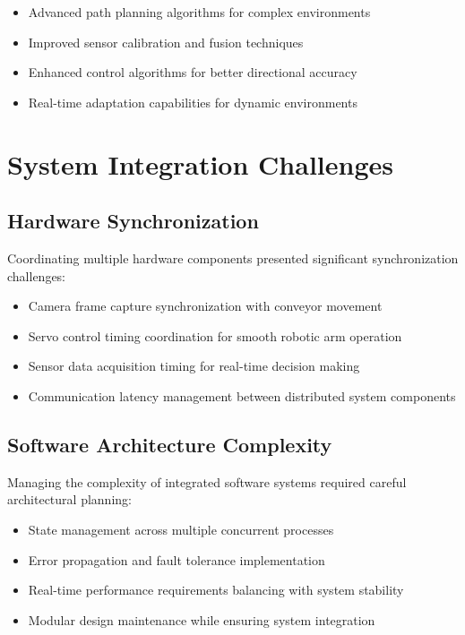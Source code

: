 \documentclass{book}
\begin{document}
\begin{itemize}
\item Advanced path planning algorithms for complex environments
\item Improved sensor calibration and fusion techniques
\item Enhanced control algorithms for better directional accuracy
\item Real-time adaptation capabilities for dynamic environments
\end{itemize}

\section{System Integration Challenges}

\subsection{Hardware Synchronization}

\par\noindent Coordinating multiple hardware components presented significant synchronization challenges:

\begin{itemize}
\item Camera frame capture synchronization with conveyor movement
\item Servo control timing coordination for smooth robotic arm operation
\item Sensor data acquisition timing for real-time decision making
\item Communication latency management between distributed system components
\end{itemize}

\subsection{Software Architecture Complexity}

\par\noindent Managing the complexity of integrated software systems required careful architectural planning:

\begin{itemize}
\item State management across multiple concurrent processes
\item Error propagation and fault tolerance implementation
\item Real-time performance requirements balancing with system stability
\item Modular design maintenance while ensuring system integration
\end{itemize}
\end{document}
